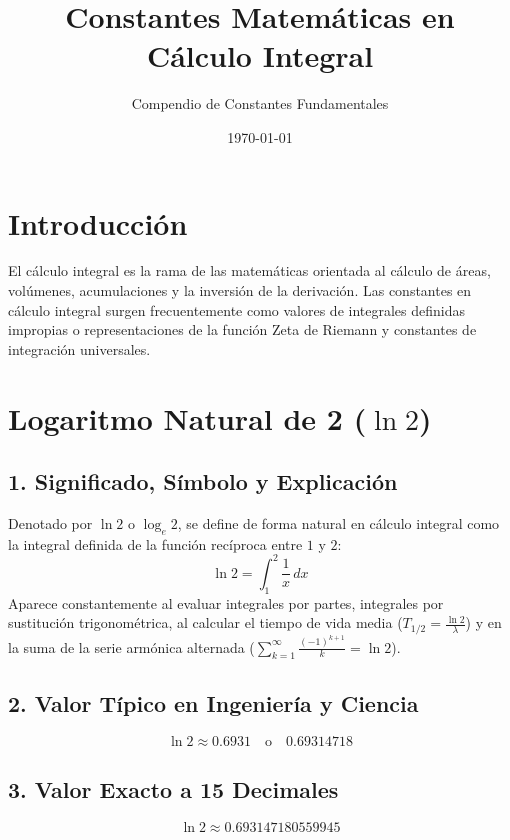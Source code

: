 \documentclass[12pt,a4paper]{article}
\title{\textbf{Constantes Matemáticas en Cálculo Integral}}
\author{Compendio de Constantes Fundamentales}
\date{\today}
\begin{document}
\maketitle

\section*{Introducción}
El cálculo integral es la rama de las matemáticas orientada al cálculo de áreas, volúmenes, acumulaciones y la inversión de la derivación. Las constantes en cálculo integral surgen frecuentemente como valores de integrales definidas impropias o representaciones de la función Zeta de Riemann y constantes de integración universales.

\section{Logaritmo Natural de 2 ($\ln 2$)}

\subsection*{1. Significado, Símbolo y Explicación}
Denotado por $\ln 2$ o $\log_e 2$, se define de forma natural en cálculo integral como la integral definida de la función recíproca entre $1$ y $2$:
\begin{equation*}
\ln 2 = \int_{1}^{2} \frac{1}{x} \, dx
\end{equation*}
Aparece constantemente al evaluar integrales por partes, integrales por sustitución trigonométrica, al calcular el tiempo de vida media ($T_{1/2} = \frac{\ln 2}{\lambda}$) y en la suma de la serie armónica alternada ($\sum_{k=1}^\infty \frac{(-1)^{k+1}}{k} = \ln 2$).

\subsection*{2. Valor Típico en Ingeniería y Ciencia}
\begin{equation*}
\ln 2 \approx 0.6931 \quad \text{o} \quad 0.69314718
\end{equation*}

\subsection*{3. Valor Exacto a 15 Decimales}
\begin{equation*}
\ln 2 \approx 0.693147180559945
\end{equation*}
\end{document}
